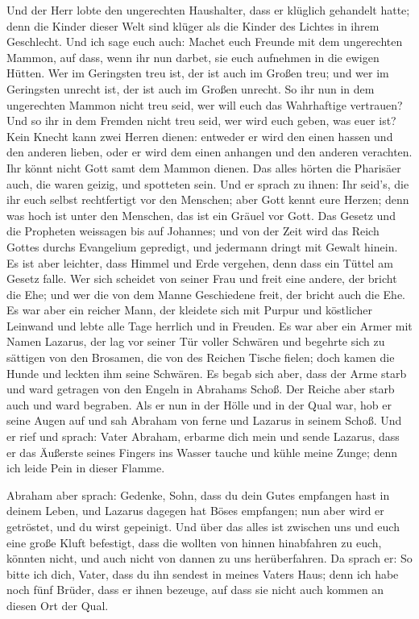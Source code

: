  Und der Herr lobte den ungerechten Haushalter, dass er
klüglich gehandelt hatte; denn die Kinder dieser Welt sind klüger als
die Kinder des Lichtes in ihrem Geschlecht.  Und ich sage
euch auch: Machet euch Freunde mit dem ungerechten Mammon, auf dass,
wenn ihr nun darbet, sie euch aufnehmen in die ewigen Hütten.
 Wer im Geringsten treu ist, der ist auch im Großen treu;
und wer im Geringsten unrecht ist, der ist auch im Großen unrecht.
 So ihr nun in dem ungerechten Mammon nicht treu seid,
wer will euch das Wahrhaftige vertrauen?  Und so ihr in
dem Fremden nicht treu seid, wer wird euch geben, was euer ist?
 Kein Knecht kann zwei Herren dienen: entweder er wird
den einen hassen und den anderen lieben, oder er wird dem einen anhangen
und den anderen verachten. Ihr könnt nicht Gott samt dem Mammon dienen.
 Das alles hörten die Pharisäer auch, die waren geizig,
und spotteten sein.  Und er sprach zu ihnen: Ihr seid's,
die ihr euch selbst rechtfertigt vor den Menschen; aber Gott kennt eure
Herzen; denn was hoch ist unter den Menschen, das ist ein Gräuel vor
Gott.  Das Gesetz und die Propheten weissagen bis auf
Johannes; und von der Zeit wird das Reich Gottes durchs Evangelium
gepredigt, und jedermann dringt mit Gewalt hinein.  Es
ist aber leichter, dass Himmel und Erde vergehen, denn dass ein Tüttel
am Gesetz falle.  Wer sich scheidet von seiner Frau und
freit eine andere, der bricht die Ehe; und wer die von dem Manne
Geschiedene freit, der bricht auch die Ehe.  Es war aber
ein reicher Mann, der kleidete sich mit Purpur und köstlicher Leinwand
und lebte alle Tage herrlich und in Freuden.  Es war aber
ein Armer mit Namen Lazarus, der lag vor seiner Tür voller Schwären
 und begehrte sich zu sättigen von den Brosamen, die von
des Reichen Tische fielen; doch kamen die Hunde und leckten ihm seine
Schwären.  Es begab sich aber, dass der Arme starb und
ward getragen von den Engeln in Abrahams Schoß. Der Reiche aber starb
auch und ward begraben.  Als er nun in der Hölle und in
der Qual war, hob er seine Augen auf und sah Abraham von ferne und
Lazarus in seinem Schoß.  Und er rief und sprach: Vater
Abraham, erbarme dich mein und sende Lazarus, dass er das Äußerste
seines Fingers ins Wasser tauche und kühle meine Zunge; denn ich leide
Pein in dieser Flamme.

 Abraham aber sprach: Gedenke, Sohn, dass du dein Gutes
empfangen hast in deinem Leben, und Lazarus dagegen hat Böses empfangen;
nun aber wird er getröstet, und du wirst gepeinigt.  Und
über das alles ist zwischen uns und euch eine große Kluft befestigt,
dass die wollten von hinnen hinabfahren zu euch, könnten nicht, und auch
nicht von dannen zu uns herüberfahren.  Da sprach er: So
bitte ich dich, Vater, dass du ihn sendest in meines Vaters Haus;
 denn ich habe noch fünf Brüder, dass er ihnen bezeuge,
auf dass sie nicht auch kommen an diesen Ort der Qual.

